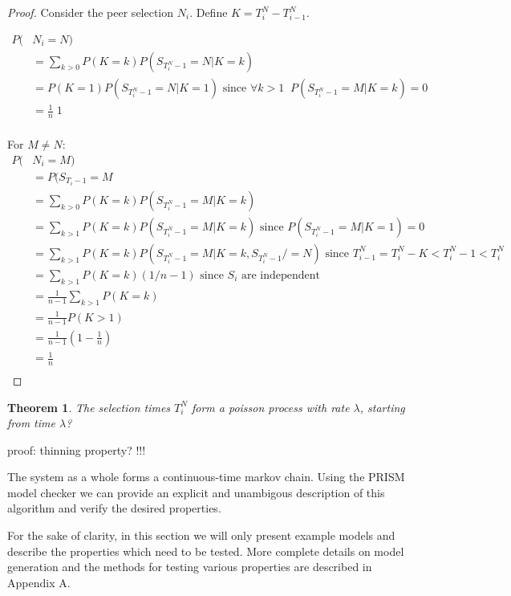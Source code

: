 \documentclass[a4paper,10pt]{article}
\newcommand{\prismmodel}[1]{
  \begin{quotation}
  \footnotesize
  
  \end{quotation}
}
\newtheorem*{thm}{Theorem}
\begin{document}
\begin{proof}
Consider the peer selection $N_i$. Define $K = T^N_i - T^N_{i-1}$.

\begin{align*}
P(&N_i = N) \\
& = \sum_{k>0} P(K=k) P(S_{T^N_i-1}=N | K=k) \\
& = P(K=1) P(S_{T^N_i-1}=N | K=1) \text{ since $\forall k>1 \;\; P(S_{T^N_i-1}=M | K=k) = 0$} \\
& = \frac{1}{n} \; 1 \\
\end{align*}

\noindent For $M \neq N$: \\
\begin{align*}
P(&N_i = M) \\
& = P(S_{T_i-1} = M \\
& = \sum_{k>0} P(K=k) P(S_{T^N_i-1}=M | K=k) \\
& = \sum_{k>1} P(K=k) P(S_{T^N_i-1}=M | K=k) \text{ since $P(S_{T^N_i-1}=M | K=1) = 0$} \\
& = \sum_{k>1} P(K=k) P(S_{T^N_i-1}=M | K=k, S_{T^N_i-1} /= N) \text{ since $T^N_{i-1} = T^N_i - K < T^N_i-1 < T^N_i$} \\
& = \sum_{k>1} P(K=k) (1 / n-1) \text{ since $S_i$ are independent} \\
& = \frac{1}{n-1} \sum_{k>1} P(K=k) \\
& = \frac{1}{n-1} P(K>1) \\
& = \frac{1}{n-1} (1 - \frac{1}{n}) \\
& = \frac{1}{n} \\
\end{align*}

\end{proof}

\begin{thm}The selection times $T^N_i$ form a poisson process with rate $\lambda$, starting from time $\lambda$?\end{thm}

proof: thinning property? !!!

The system as a whole forms a continuous-time markov chain. Using the PRISM model checker we can provide an explicit and unambigous description of this algorithm and verify the desired properties.

\prismmodel{ctmc_single}

For the sake of clarity, in this section we will only present example models and describe the properties which need to be tested. More complete details on model generation and the methods for testing various properties are described in Appendix A.
\end{document}
